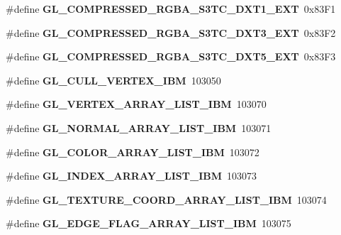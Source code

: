 \begin{DoxyCompactItemize}
\item 
\#define {\bfseries G\+L\+\_\+\+C\+O\+M\+P\+R\+E\+S\+S\+E\+D\+\_\+\+R\+G\+B\+A\+\_\+\+S3\+T\+C\+\_\+\+D\+X\+T1\+\_\+\+E\+X\+T}~0x83\+F1\label{_s_d_l__opengl_8h_aaeed69f7c55e377901d9ff6d00463efa}

\item 
\#define {\bfseries G\+L\+\_\+\+C\+O\+M\+P\+R\+E\+S\+S\+E\+D\+\_\+\+R\+G\+B\+A\+\_\+\+S3\+T\+C\+\_\+\+D\+X\+T3\+\_\+\+E\+X\+T}~0x83\+F2\label{_s_d_l__opengl_8h_aababc4e27a4845063f8d1b7b91c20b2e}

\item 
\#define {\bfseries G\+L\+\_\+\+C\+O\+M\+P\+R\+E\+S\+S\+E\+D\+\_\+\+R\+G\+B\+A\+\_\+\+S3\+T\+C\+\_\+\+D\+X\+T5\+\_\+\+E\+X\+T}~0x83\+F3\label{_s_d_l__opengl_8h_a5f6e032bc5f877d09491c9a8ed191571}

\item 
\#define {\bfseries G\+L\+\_\+\+C\+U\+L\+L\+\_\+\+V\+E\+R\+T\+E\+X\+\_\+\+I\+B\+M}~103050\label{_s_d_l__opengl_8h_a23dfc5378a832ed1f786a4d0eedb3270}

\item 
\#define {\bfseries G\+L\+\_\+\+V\+E\+R\+T\+E\+X\+\_\+\+A\+R\+R\+A\+Y\+\_\+\+L\+I\+S\+T\+\_\+\+I\+B\+M}~103070\label{_s_d_l__opengl_8h_a1fe27df3f44e58b5055499681c143e78}

\item 
\#define {\bfseries G\+L\+\_\+\+N\+O\+R\+M\+A\+L\+\_\+\+A\+R\+R\+A\+Y\+\_\+\+L\+I\+S\+T\+\_\+\+I\+B\+M}~103071\label{_s_d_l__opengl_8h_a37da9e08b1b313f1d5e89a7b8610da26}

\item 
\#define {\bfseries G\+L\+\_\+\+C\+O\+L\+O\+R\+\_\+\+A\+R\+R\+A\+Y\+\_\+\+L\+I\+S\+T\+\_\+\+I\+B\+M}~103072\label{_s_d_l__opengl_8h_a229a2525a705825ba39bc2d5e676a113}

\item 
\#define {\bfseries G\+L\+\_\+\+I\+N\+D\+E\+X\+\_\+\+A\+R\+R\+A\+Y\+\_\+\+L\+I\+S\+T\+\_\+\+I\+B\+M}~103073\label{_s_d_l__opengl_8h_af3bcf9acb8c6e1ba50f13a9372c5b7b1}

\item 
\#define {\bfseries G\+L\+\_\+\+T\+E\+X\+T\+U\+R\+E\+\_\+\+C\+O\+O\+R\+D\+\_\+\+A\+R\+R\+A\+Y\+\_\+\+L\+I\+S\+T\+\_\+\+I\+B\+M}~103074\label{_s_d_l__opengl_8h_acff3e2f228e19c5dc24c4047adafc58a}

\item 
\#define {\bfseries G\+L\+\_\+\+E\+D\+G\+E\+\_\+\+F\+L\+A\+G\+\_\+\+A\+R\+R\+A\+Y\+\_\+\+L\+I\+S\+T\+\_\+\+I\+B\+M}~103075\label{_s_d_l__opengl_8h_a7dd06e299288ea4963676e62a676fe46}


\end{DoxyCompactItemize}
